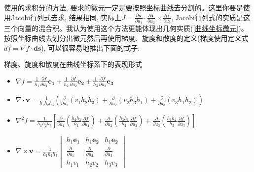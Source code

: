 使用的求积分的方法, 要求的微元一定是要按照坐标曲线去分割的。这里你要是使用Jacobi行列式去求, 结果相同, 实际上$J=\frac{\partial \bm{x}}{\partial u_1}\cdot
\frac{\partial \bm{x}}{\partial u_2}\times\frac{\partial \bm{x}}{\partial u_3}$, Jacobi行列式的实质是这三个向量的混合积。我认为使用这个方法更能体现出几何实质(\ref{曲线坐标微元})。
按照坐标曲线去划分出微元然后再使用梯度、旋度和散度的定义(梯度使用定义式$df=\nabla f \cdot \bm{ds}$), 可以很容易地推出下面的式子:
\begin{theorem}{梯度、旋度和散度在曲线坐标系下的表现形式}
    \begin{itemize}
        \item $\nabla f = \frac{1}{h_1}\frac{\partial f}{\partial u_1}\bm{e_1}+\frac{1}{h_2}\frac{\partial f}{\partial u_2}\bm{e_2}+\frac{1}{h_3}\frac{\partial f}{\partial u_3}\bm{e_3}$
        \item $\nabla \cdot \bm{v} = \frac{1}{h_1h_2h_3}\left(\frac{\partial}{\partial u_1}(v_1h_2h_3)+\frac{\partial}{\partial u_2}(v_2h_3h_1)+\frac{\partial}{\partial u_3}(v_3h_1h_2)\right)$
        \item $\nabla^2 f = \frac{1}{h_1h_2h_3}\left[\frac{\partial}{\partial u_1}\left(\frac{h_2h_3}{h_1}\frac{\partial f}{\partial u_1}\right)
               +\frac{\partial}{\partial u_2}\left(\frac{h_3h_1}{h_2}\frac{\partial f}{\partial u_2}\right)
               +\frac{\partial}{\partial u_3}\left(\frac{h_1h_2}{h_3}\frac{\partial f}{\partial u_3}\right)\right]$
        \item 
        \begin{math}
            \displaystyle
            \nabla \times \bm{v}=
            \frac{1}{h_1h_2h_3} 
            \begin{vmatrix}
            h_1\bm{e_1}&  h_1\bm{e_2} & h_1\bm{e_2} \\
            \frac{\partial }{\partial u_1} & \frac{\partial }{\partial u_2} & \frac{\partial }{\partial u_3}\\
            h_1v_1 & h_2v_2 & h_3v_3
            \end{vmatrix}
        \end{math}
    \end{itemize}
\end{theorem}
